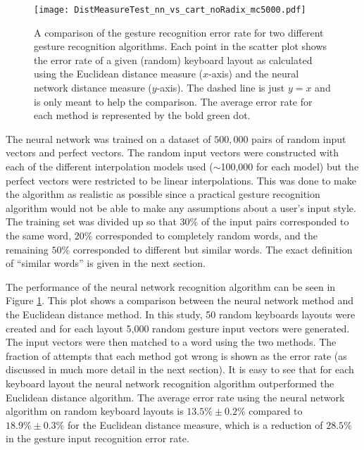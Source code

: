 \documentclass[final,1p,times,authoryear]{elsarticle}
\begin{document}
\begin{figure}[tbh]
\begin{centering}
\texttt{[image: DistMeasureTest\_nn\_vs\_cart\_noRadix\_mc5000.pdf]}
\par\end{centering}
\smallskip{}
\protect\caption{A comparison of the gesture recognition error rate for two 
different gesture recognition algorithms. Each point in the scatter plot shows the
error rate of a given (random) keyboard layout as calculated using the Euclidean distance
measure ($x$-axis) and the neural network distance measure ($y$-axis). The dashed line
is just $y=x$ and is only meant to help the comparison. The average error rate for each 
method is represented by the bold green dot.\label{fig:The-performance-of-NN}}
\end{figure}

The neural network was trained on a dataset of $500,000$ pairs of
random input vectors and perfect vectors. The random input vectors
were constructed with each of the different interpolation models used
($\sim$100,000 for each model) but the perfect vectors
were restricted to be linear interpolations. This was done to make
the algorithm as realistic as possible since a practical gesture recognition algorithm
would not be able to make any assumptions about a user's input style.
The training set was divided up so that $30\%$ of the input pairs
corresponded to the same word, $20\%$ corresponded to completely
random words, and the remaining $50\%$ corresponded to different
but similar words. The exact definition of ``similar words'' is
given in the next section. 

The performance of the neural network recognition algorithm can be seen in Figure \ref{fig:The-performance-of-NN}.
This plot shows a comparison between the neural network method and the Euclidean distance method.
In this study, 50 random keyboards layouts were created and for each layout 5,000 random gesture input vectors were generated.
The input vectors were then matched to a word using the two methods. 
The fraction of attempts that each method got wrong is shown as the error rate (as discussed in much more detail in the next section).
It is easy to see that for each keyboard layout the neural network recognition algorithm outperformed the Euclidean distance algorithm. 
The average error rate using the neural network algorithm on random  keyboard layouts is $13.5\% \pm 0.2\%$ compared to $18.9\% \pm 0.3\%$ for the Euclidean distance measure, which is a reduction of $28.5\%$ in the gesture input recognition error rate.
\end{document}
